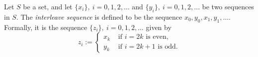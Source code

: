 \documentclass{article}
\begin{document}
Let $S$ be a set, and let $\{x_i\},\ i=0,1,2,\dots$ and $\{y_i\},\ i=0,1,2,\dots$ be two sequences in $S$. The {\em interleave sequence} is defined to be the sequence $x_0, y_0, x_1, y_1, \dots$. Formally, it is the sequence $\{z_i\},\ i=0,1,2,\dots$ given by
$$
z_i :=
\begin{cases}
x_k & \text{\ \ if } i=2k \text{ is even,}\\
y_k & \text{\ \ if } i=2k+1 \text{ is odd.}
\end{cases}
$$
\end{document}
